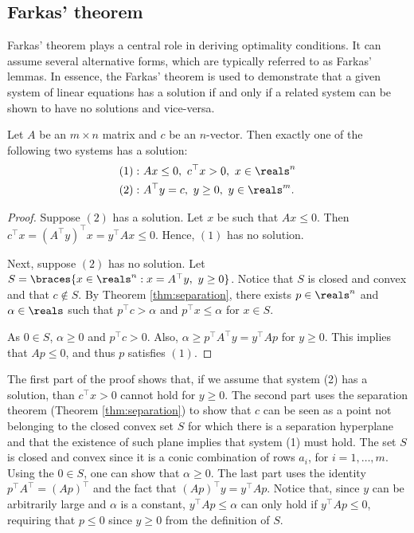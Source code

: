 \subsection{Farkas' theorem}

Farkas' theorem plays a central role in deriving optimality conditions. It can assume several alternative forms, which are typically referred to as Farkas' lemmas. In essence, the Farkas' theorem is used to demonstrate that a given system of linear equations has a solution if and only if a related system can be shown to have no solutions and vice-versa. 

\begin{theorem}
	Let $A$ be an $m \times n$ matrix and $c$ be an $n$-vector. Then exactly one of the following two systems has a solution:
	\begin{align*}
		(1) :~ &Ax \leq 0, \ c^\top x > 0, \ x \in \reals^n\\
		(2) :~ &A^\top y = c, \ y \geq 0, \ y \in \reals^m.  
	\end{align*}
\end{theorem}

\begin{proof}
	Suppose $(2)$ has a solution. Let $x$ be such that $Ax \leq 0$. Then $c^\top x = (A^\top y)^\top x = y^\top Ax \leq 0$. Hence, $(1)$ has no solution. 
	
	Next, suppose $(2)$ has no solution. Let $S = \braces{x \in \reals^n : x = A^\top y, \ y \geq 0}$. \hspace{-3pt}Notice that $S$ is closed and convex and that $c \notin S$. By Theorem \ref{thm:separation}, there exists $p \in \reals^n$ and $\alpha \in \reals$ such that $p^\top c > \alpha$ and $p^\top x \leq \alpha$ for $x \in S$. 
	
	As $0 \in S$, $\alpha \geq 0$ and $p^\top c > 0$. Also, $\alpha \geq p^\top A^\top y = y^\top Ap$ for $y \geq 0$. This implies that $Ap \leq 0$, and thus $p$ satisfies $(1)$. 
\end{proof}

The first part of the proof shows that, if we assume that system (2) has a solution, than $c^\top x > 0$ cannot hold for $y \geq 0$. The second part uses the separation theorem (Theorem \ref{thm:separation}) to show that $c$ can be seen as a point not belonging to the closed convex set $S$ for which there is a separation hyperplane and that the existence of such plane implies that system (1) must hold. The set $S$ is closed and convex since it is a conic combination of rows $a_i$, for $i=1, \dots, m$. Using the $0 \in S$, one can show that $\alpha \geq 0$. The last part uses the identity $p^\top A^\top  = (Ap)^\top$ and the fact that $(Ap)^\top y = y^\top Ap$. Notice that, since $y$ can be arbitrarily large and $\alpha$ is a constant, $y^\top Ap \leq \alpha$ can only hold if $y^\top Ap \leq 0$, requiring that $p \leq 0$ since $y \geq 0$ from the definition of $S$.

